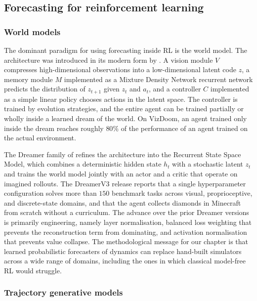 \subsection{Forecasting for reinforcement learning}
\label{sec:forecasting_for_rl}

\subsubsection{World models}
\label{sec:world_models}

The dominant paradigm for using forecasting inside RL is the world model. The
architecture was introduced in its modern form by \citet{HaSchmidhuber2018}. A
vision module $V$ compresses high-dimensional observations into a low-dimensional
latent code $z$, a memory module $M$ implemented as a Mixture Density Network
recurrent network predicts the distribution of $z_{t+1}$ given $z_t$ and $a_t$, and
a controller $C$ implemented as a simple linear policy chooses actions in the
latent space. The controller is trained by evolution strategies, and the entire
agent can be trained partially or wholly inside a learned dream of the world. On
VizDoom, an agent trained only inside the dream reaches roughly $80\%$ of the
performance of an agent trained on the actual environment.

The Dreamer family of \citet{Hafner2025} refines the architecture into the Recurrent
State Space Model, which combines a deterministic hidden state $h_t$ with a
stochastic latent $z_t$ and trains the world model jointly with an actor and a
critic that operate on imagined rollouts. The DreamerV3 release reports that a
single hyperparameter configuration solves more than $150$ benchmark tasks across
visual, proprioceptive, and discrete-state domains, and that the agent collects
diamonds in Minecraft from scratch without a curriculum. The advance over the prior
Dreamer versions is primarily engineering, namely layer normalisation, balanced
loss weighting that prevents the reconstruction term from dominating, and
activation normalisation that prevents value collapse. The methodological message
for our chapter is that learned probabilistic forecasters of dynamics can replace
hand-built simulators across a wide range of domains, including the ones in
which classical model-free RL would struggle.

\subsubsection{Trajectory generative models}
\label{sec:trajectory_models}

